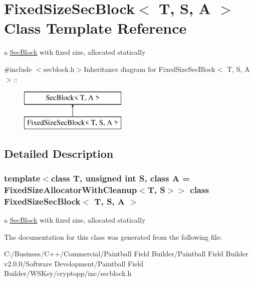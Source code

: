 \hypertarget{class_fixed_size_sec_block}{
\section{FixedSizeSecBlock$<$ T, S, A $>$ Class Template Reference}
\label{class_fixed_size_sec_block}
}


a \hyperlink{class_sec_block}{SecBlock} with fixed size, allocated statically  


{\ttfamily \#include $<$secblock.h$>$}Inheritance diagram for FixedSizeSecBlock$<$ T, S, A $>$::\begin{figure}[H]
\begin{center}
\leavevmode
\includegraphics[height=2cm]{class_fixed_size_sec_block}
\end{center}
\end{figure}


\subsection{Detailed Description}
\subsubsection*{template$<$class T, unsigned int S, class A = FixedSizeAllocatorWithCleanup$<$T, S$>$$>$ class FixedSizeSecBlock$<$ T, S, A $>$}

a \hyperlink{class_sec_block}{SecBlock} with fixed size, allocated statically 

The documentation for this class was generated from the following file:\begin{DoxyCompactItemize}
\item 
C:/Business/C++/Commercial/Paintball Field Builder/Paintball Field Builder v2.0.0/Software Development/Paintball Field Builder/WSKey/cryptopp/inc/secblock.h\end{DoxyCompactItemize}
